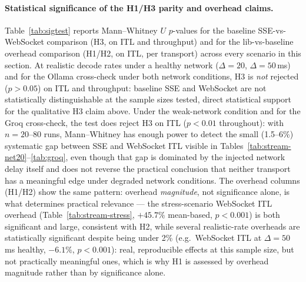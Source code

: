 \documentclass[11pt]{article}
\begin{document}
\paragraph{Statistical significance of the H1/H3 parity and overhead claims.} Table~\ref{tab:sigtest} reports Mann--Whitney $U$ $p$-values for the baseline SSE-vs-WebSocket comparison (H3, on ITL and throughput) and for the lib-vs-baseline overhead comparison (H1/H2, on ITL, per transport) across every scenario in this section. At realistic decode rates under a healthy network ($\Delta=20$, $\Delta=50$\,ms) and for the Ollama cross-check under both network conditions, H3 is \emph{not} rejected ($p>0.05$) on ITL and throughput: baseline SSE and WebSocket are not statistically distinguishable at the sample sizes tested, direct statistical support for the qualitative H3 claim above. Under the weak-network condition and for the Groq cross-check, the test does reject H3 on ITL ($p<0.01$ throughout): with $n=20$--$80$ runs, Mann--Whitney has enough power to detect the small (1.5--6\%) systematic gap between SSE and WebSocket ITL visible in Tables~\ref{tab:stream-net20}--\ref{tab:groq}, even though that gap is dominated by the injected network delay itself and does not reverse the practical conclusion that neither transport has a meaningful edge under degraded network conditions. The overhead columns (H1/H2) show the same pattern: overhead \emph{magnitude}, not significance alone, is what determines practical relevance --- the stress-scenario WebSocket ITL overhead (Table~\ref{tab:stream-stress}, $+45.7\%$ mean-based, $p<0.001$) is both significant and large, consistent with H2, while several realistic-rate overheads are statistically significant despite being under 2\% (e.g.\ WebSocket ITL at $\Delta=50$\,ms healthy, $-6.1\%$, $p<0.001$): real, reproducible effects at this sample size, but not practically meaningful ones, which is why H1 is assessed by overhead magnitude rather than by significance alone.
\end{document}
